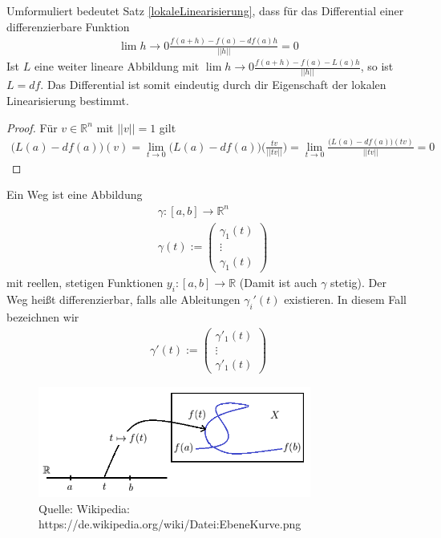 \begin{Bemerkung}
\label{differentialeindeutig}
Umformuliert bedeutet Satz \ref{lokaleLinearisierung}, dass für das Differential einer differenzierbare Funktion
\begin{align}
\lim{h \to 0} \frac{f(a + h) -f(a) - df(a) h }{||h||} = 0
\end{align}
Ist $L$ eine weiter lineare Abbildung mit $\lim{h \to 0} \frac{f(a + h) -f(a) - L(a) h }{||h||}$, so ist $L = df$. Das Differential ist somit eindeutig durch dir Eigenschaft der lokalen Linearisierung bestimmt.
\end{Bemerkung}
\begin{proof}
Für $v \in \mathbb{R}^n$ mit $||v|| = 1$ gilt 
\begin {align*}
\bigl( L(a) - df(a) \bigr)(v) =  \lim_{t \to 0}  \bigl( L(a) - df(a) \bigr) \bigl( \frac{tv}{||tv||} \bigr) = \lim_{t \to 0} \frac{\bigl( L(a) - df(a) \bigr)(tv) }{||tv||} = 0
\end{align*}
\end{proof}

\begin{Definition}
Ein Weg ist eine Abbildung  
\begin{align*}
& \gamma:  [a,b] \to \mathbb{R}^n \\
& \gamma (t) :=  \begin{pmatrix} \gamma_1(t) \\ \vdots \\ \gamma_1(t) \end{pmatrix}
\end{align*}
mit reellen, stetigen Funktionen $y_i : [a,b] \to \mathbb{R}$ (Damit ist auch $\gamma$ stetig). Der Weg heißt differenzierbar, falls alle Ableitungen $\gamma_i'(t)$ existieren. In diesem Fall bezeichnen wir
\begin{align*}
 \gamma' (t) :=  \begin{pmatrix} \gamma'_1(t) \\ \vdots \\ \gamma'_1(t) \end{pmatrix}
\end{align*}
\end{Definition}

\begin{figure}[H]
      \centering
    \includegraphics[width=0.8\textwidth]{images/EbeneKurve}
      \caption{Quelle: Wikipedia: https://de.wikipedia.org/wiki/Datei:EbeneKurve.png}
\end{figure}

